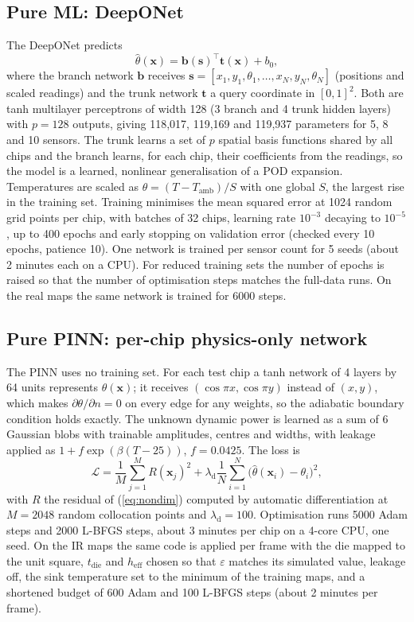 \documentclass[journal]{IEEEtran}
\begin{document}
\subsection{Pure ML: DeepONet}
The DeepONet \cite{lu2021deeponet} predicts
\begin{equation}
\hat\theta(\mathbf{x}) = \mathbf{b}(\mathbf{s})^\top\mathbf{t}(\mathbf{x}) + b_0,
\end{equation}
where the branch network $\mathbf{b}$ receives $\mathbf{s}=[x_1,y_1,\theta_1,\dots,x_N,y_N,\theta_N]$ (positions and scaled readings) and the trunk network $\mathbf{t}$ a query coordinate in $[0,1]^2$.
Both are tanh multilayer perceptrons of width 128 (3 branch and 4 trunk hidden layers) with $p=128$ outputs, giving 118,017, 119,169 and 119,937 parameters for 5, 8 and 10 sensors.
The trunk learns a set of $p$ spatial basis functions shared by all chips and the branch learns, for each chip, their coefficients from the readings, so the model is a learned, nonlinear generalisation of a POD expansion.
Temperatures are scaled as $\theta=(T-T_\mathrm{amb})/S$ with one global $S$, the largest rise in the training set.
Training minimises the mean squared error at 1024 random grid points per chip, with batches of 32 chips, learning rate $10^{-3}$ decaying to $10^{-5}$, up to 400 epochs and early stopping on validation error (checked every 10 epochs, patience 10).
One network is trained per sensor count for 5 seeds (about 2 minutes each on a CPU).
For reduced training sets the number of epochs is raised so that the number of optimisation steps matches the full-data runs.
On the real maps the same network is trained for 6000 steps.

\subsection{Pure PINN: per-chip physics-only network}
The PINN uses no training set.
For each test chip a tanh network of 4 layers by 64 units represents $\theta(\mathbf{x})$; it receives $(\cos\pi x,\cos\pi y)$ instead of $(x,y)$, which makes $\partial\theta/\partial n=0$ on every edge for any weights, so the adiabatic boundary condition holds exactly.
The unknown dynamic power is learned as a sum of 6 Gaussian blobs with trainable amplitudes, centres and widths, with leakage applied as $1+f\exp(\beta(T-25))$, $f=0.0425$.
The loss is
\begin{equation}
\mathcal L = \frac{1}{M}\sum_{j=1}^{M} R(\mathbf{x}_j)^2 + \lambda_\mathrm{d}\frac{1}{N}\sum_{i=1}^{N}\big(\hat\theta(\mathbf{x}_i)-\theta_i\big)^2,
\end{equation}
with $R$ the residual of (\ref{eq:nondim}) computed by automatic differentiation at $M=2048$ random collocation points and $\lambda_\mathrm{d}=100$.
Optimisation runs 5000 Adam steps and 2000 L-BFGS steps, about 3 minutes per chip on a 4-core CPU, one seed.
On the IR maps the same code is applied per frame with the die mapped to the unit square, $t_\mathrm{die}$ and $h_\mathrm{eff}$ chosen so that $\varepsilon$ matches its simulated value, leakage off, the sink temperature set to the minimum of the training maps, and a shortened budget of 600 Adam and 100 L-BFGS steps (about 2 minutes per frame).
\end{document}
